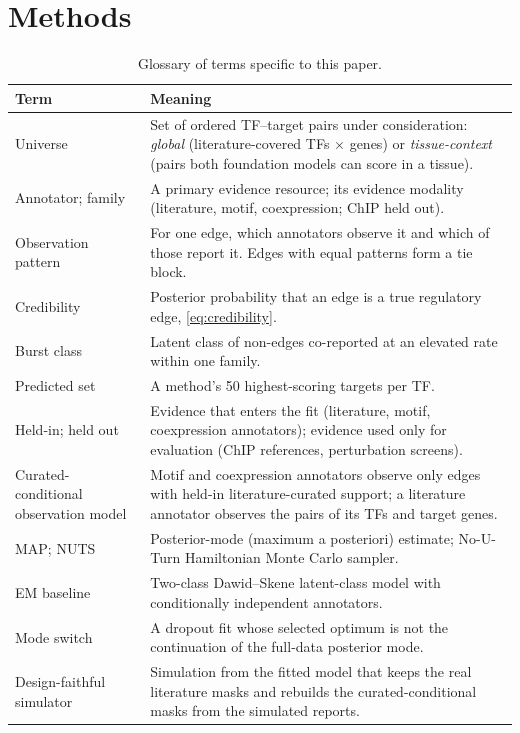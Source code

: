 \documentclass[11pt,a4paper]{article}
\begin{document}
\section{Methods}\label{sec:methods}

\begin{table}[!t]
  \centering
  \caption{Glossary of terms specific to this paper.}
  \label{tab:glossary}
  \small
  \begin{tabular}{@{}p{}p{}@{}}
    \toprule
    Term & Meaning \\
    \midrule
    Universe & Set of ordered TF--target pairs under consideration: \emph{global} (literature-covered TFs $\times$ genes) or \emph{tissue-context} (pairs both foundation models can score in a tissue). \\
    Annotator; family & A primary evidence resource; its evidence modality (literature, motif, coexpression; ChIP held out). \\
    Observation pattern & For one edge, which annotators observe it and which of those report it. Edges with equal patterns form a tie block. \\
    Credibility & Posterior probability that an edge is a true regulatory edge, \cref{eq:credibility}. \\
    Burst class & Latent class of non-edges co-reported at an elevated rate within one family. \\
    Predicted set & A method's 50 highest-scoring targets per TF. \\
    Held-in; held out & Evidence that enters the fit (literature, motif, coexpression annotators); evidence used only for evaluation (ChIP references, perturbation screens). \\
    Curated-conditional observation model & Motif and coexpression annotators observe only edges with held-in literature-curated support; a literature annotator observes the pairs of its TFs and target genes. \\
    MAP; NUTS & Posterior-mode (maximum a posteriori) estimate; No-U-Turn Hamiltonian Monte Carlo sampler. \\
    EM baseline & Two-class Dawid--Skene latent-class model with conditionally independent annotators. \\
    Mode switch & A dropout fit whose selected optimum is not the continuation of the full-data posterior mode. \\
    Design-faithful simulator & Simulation from the fitted model that keeps the real literature masks and rebuilds the curated-conditional masks from the simulated reports. \\

\end{tabular}
\end{table}
\end{document}
